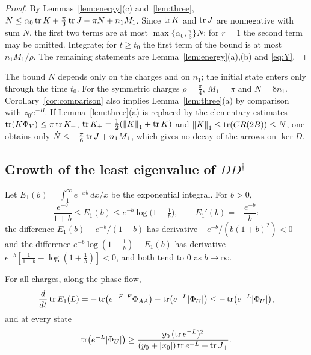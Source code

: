 \begin{proof}
By Lemmas~\ref{lem:energy}(c) and~\ref{lem:three},
$\dot N\leq\alpha_0\operatorname{tr} K+\frac\pi3\operatorname{tr} J-\pi N+n_1M_1$. Since $\operatorname{tr} K$ and
$\operatorname{tr} J$ are nonnegative with sum $N$, the first two terms are at most
$\max\{\alpha_0,\frac\pi3\}N$; for $r=1$ the second term may be omitted.
Integrate; for $t\geq t_0$ the first term of the bound is at most
$n_1M_1/\rho$. The remaining statements are Lemma~\ref{lem:energy}(a),(b) and
\eqref{eq:Y}.
\end{proof}

The bound $\bar N$ depends only on the charges and on $n_1$; the initial
state enters only through the time $t_0$. For the symmetric charges
$\rho=\frac\pi4$, $M_1=\pi$ and $\bar N=8n_1$. Corollary~\ref{cor:comparison} also implies Lemma~\ref{lem:three}(a)
by comparison with $z_0e^{-B}$. If Lemma~\ref{lem:three}(a) is replaced by the
elementary estimates $\operatorname{tr}(K\Phi_V)\leq\pi\operatorname{tr} K_+$,
$\operatorname{tr} K_+=\frac12(\left\lVert K\right\rVert_1+\operatorname{tr} K)$ and $\left\lVert K\right\rVert_1\leq\operatorname{tr}(CR(2B))\leq N$, one
obtains only $\dot N\leq-\frac\pi6\operatorname{tr} J+n_1M_1$, which gives no decay of
the arrows on $\ker D$.

\subsection{Growth of the least eigenvalue of
\texorpdfstring{$DD^\dagger$}{D D-dagger}}

Let $E_1(b)=\int_1^\infty e^{-xb}\,dx/x$ be the exponential integral. For
$b>0$,
\begin{equation}\label{eq:E1bounds}
 \frac{e^{-b}}{1+b}\leq E_1(b)\leq e^{-b}\log\bigl(1+\tfrac1b\bigr),\qquad
 E_1'(b)=-\frac{e^{-b}}b :
\end{equation}
the difference $E_1(b)-e^{-b}/(1+b)$ has derivative $-e^{-b}/(b(1+b)^2)<0$
and the difference $e^{-b}\log(1+\frac1b)-E_1(b)$ has derivative
$e^{-b}[\frac1{1+b}-\log(1+\frac1b)]<0$, and both tend to $0$ as $b\to\infty$.

\begin{lemma}\label{lem:growth}
For all charges, along the phase flow,
\[
 \frac d{dt}\operatorname{tr} E_1(L)=-\operatorname{tr}\bigl(e^{-F^\dagger F}\Phi_{AA}\bigr)-\operatorname{tr}\bigl(e^{-L}|\Phi_U|\bigr)
 \leq-\operatorname{tr}\bigl(e^{-L}|\Phi_U|\bigr),
\]
and at every state
\[
 \operatorname{tr}\bigl(e^{-L}|\Phi_U|\bigr)\geq
 \frac{y_0\,(\operatorname{tr} e^{-L})^2}{(y_0+|x_0|)\operatorname{tr} e^{-L}+\operatorname{tr} J_+} .
\]
\end{lemma}


